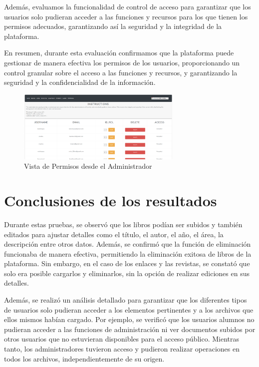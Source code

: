 \documentclass[a4paper, 12pt]{book}
\begin{document}
Además, evaluamos la funcionalidad de control de acceso para garantizar que los usuarios solo pudieran acceder a las funciones y recursos para los que tienen los 
permisos adecuados, garantizando así la seguridad y la integridad de la plataforma.

En resumen, durante esta evaluación confirmamos que la plataforma puede gestionar de manera efectiva los permisos de los usuarios, proporcionando un control 
granular sobre el acceso a las funciones y recursos, y garantizando la seguridad y la confidencialidad de la información.
\begin{figure}
  \centering
  \includegraphics[width=0.7\textwidth]{img/permisos.png}
  \caption{Vista de Permisos desde el Administrador}
  \label{fig:permisosadmin}
\end{figure}

\section{Conclusiones de los resultados}
\label{sec:resultados}

Durante estas pruebas, se observó que los libros podían ser subidos y también editados para ajustar detalles como el título, el autor, el año, el área, la descripción 
entre otros datos. 
Además, se confirmó que la función de eliminación funcionaba de manera efectiva, permitiendo la eliminación exitosa de libros de la plataforma. Sin embargo, 
en el caso de los enlaces y las revistas, se constató que solo era posible cargarlos y eliminarlos, sin la opción de realizar ediciones en sus detalles.

Además, se realizó un análisis detallado para garantizar que los diferentes tipos de usuarios solo pudieran acceder a los elementos pertinentes y a los 
archivos que ellos mismos habían cargado. Por ejemplo, se verificó que los usuarios alumnos no pudieran acceder a las funciones de administración ni ver 
documentos subidos por otros usuarios que no estuvieran disponibles para el acceso público. Mientras tanto, los administradores tuvieron acceso y pudieron 
realizar operaciones en todos los archivos, independientemente de su origen.
\end{document}
